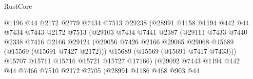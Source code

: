 \begin{lexlean}{RustCore}
\begin{coremodule}
                                    @1196
                                    @44
                                    @2172
                                    @2779
                                    @7434
                                    @7513
                                    @29238
                                    (@28991
                                      @1158
                                      @1194
                                      @442
                                      @44
                                      @7434
                                      @7443
                                      @2172
                                      @7513
                                      (@29103
                                        @7434
                                        @7441
                                        @2387
                                        (@29111
                                          @7433
                                          @7440
                                          @2338
                                          @7416
                                          @2166
                                          @29124
                                          (@29056
                                            @7426
                                            @2166
                                            @29065
                                            @29068
                                            @15689
                                            (@15569 (@15691 @7427 @2172)))
                                          @15689
                                          (@15569 (@15691 @7417 @7433)))
                                        @15707
                                        @15711
                                        @15716
                                        @15721
                                        @15727
                                        @17166)
                                      (@29092
                                        @7443
                                        @1194
                                        @442
                                        @44
                                        @7466
                                        @7510
                                        @2172
                                        @2705
                                        (@28991
                                          @1186
                                          @468
                                          @903
                                          @44

\end{coremodule}
\end{lexlean}
